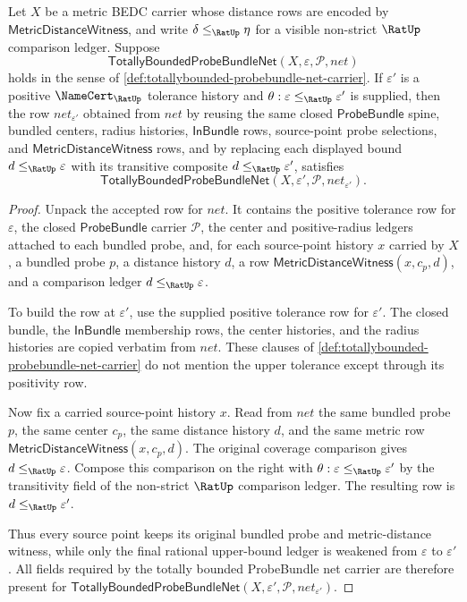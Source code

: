 \begin{theorem}
\label{thm:totallybounded-probebundle-net-tolerance-weakening}
Let $X$ be a metric BEDC carrier whose distance rows are encoded by
$\mathsf{MetricDistanceWitness}$, and write $\delta\le_{\RatUp}\eta$ for a
visible non-strict $\RatUp$ comparison ledger. Suppose
$$
\mathsf{TotallyBoundedProbeBundleNet}(X,\varepsilon,\mathcal{P},net)
$$
holds in the sense of \autoref{def:totallybounded-probebundle-net-carrier}.
If $\varepsilon'$ is a positive $\NameCert_{\RatUp}$ tolerance history and
$\theta:\varepsilon\le_{\RatUp}\varepsilon'$ is supplied, then the row
$net_{\varepsilon'}$ obtained from $net$ by reusing the same closed
$\mathsf{ProbeBundle}$ spine, bundled centers, radius histories,
$\mathsf{InBundle}$ rows, source-point probe selections, and
$\mathsf{MetricDistanceWitness}$ rows, and by replacing each displayed bound
$d\le_{\RatUp}\varepsilon$ with its transitive composite
$d\le_{\RatUp}\varepsilon'$, satisfies
$$
\mathsf{TotallyBoundedProbeBundleNet}(X,\varepsilon',\mathcal{P},net_{\varepsilon'}).
$$
\end{theorem}
\begin{proof}
Unpack the accepted row for $net$. It contains the positive tolerance row for
$\varepsilon$, the closed $\mathsf{ProbeBundle}$ carrier $\mathcal{P}$, the
center and positive-radius ledgers attached to each bundled probe, and, for
each source-point history $x$ carried by $X$, a bundled probe $p$, a distance
history $d$, a row $\mathsf{MetricDistanceWitness}(x,c_p,d)$, and a comparison
ledger $d\le_{\RatUp}\varepsilon$.

To build the row at $\varepsilon'$, use the supplied positive tolerance row for
$\varepsilon'$. The closed bundle, the $\mathsf{InBundle}$ membership rows, the
center histories, and the radius histories are copied verbatim from $net$.
These clauses of \autoref{def:totallybounded-probebundle-net-carrier} do not
mention the upper tolerance except through its positivity row.

Now fix a carried source-point history $x$. Read from $net$ the same bundled
probe $p$, the same center $c_p$, the same distance history $d$, and the same
metric row $\mathsf{MetricDistanceWitness}(x,c_p,d)$. The original coverage
comparison gives $d\le_{\RatUp}\varepsilon$. Compose this comparison on the
right with $\theta:\varepsilon\le_{\RatUp}\varepsilon'$ by the transitivity
field of the non-strict $\RatUp$ comparison ledger. The resulting row is
$d\le_{\RatUp}\varepsilon'$.

Thus every source point keeps its original bundled probe and metric-distance
witness, while only the final rational upper-bound ledger is weakened from
$\varepsilon$ to $\varepsilon'$. All fields required by the totally bounded
ProbeBundle net carrier are therefore present for
$\mathsf{TotallyBoundedProbeBundleNet}(X,\varepsilon',\mathcal{P},net_{\varepsilon'})$.
\end{proof}

